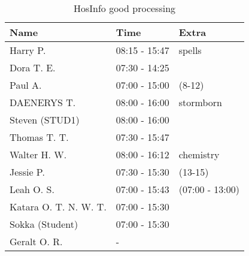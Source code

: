 \begin{table}[H]
    \centering
    \begin{tabular}{|l|l|l|}
        \hline
        \textbf{Name}         & \textbf{Time} & \textbf{Extra}  \\ \hline
        Harry P.              & 08:15 - 15:47 & spells          \\ \hline
        Dora T. E.            & 07:30 - 14:25 &                 \\ \hline
        Paul A.               & 07:00 - 15:00 & (8-12)          \\ \hline
        DAENERYS T.           & 08:00 - 16:00 & stormborn       \\ \hline
        Steven (STUD1)        & 08:00 - 16:00 &                 \\ \hline
        Thomas T. T.          & 07:30 - 15:47 &                 \\ \hline
        Walter H. W.          & 08:00 - 16:12 & chemistry       \\ \hline
        Jessie P.             & 07:30 - 15:30 & (13-15)         \\ \hline
        Leah O. S.            & 07:00 - 15:43 & (07:00 - 13:00) \\ \hline
        Katara O. T. N. W. T. & 07:00 - 15:30 &                 \\ \hline
        Sokka (Student)       & 07:00 - 15:30 &                 \\ \hline
        Geralt O. R.          & -             &                 \\ \hline
    \end{tabular}
    \caption{HosInfo good processing}
    \label{tab:HosInfo-good-processing}
\end{table}

